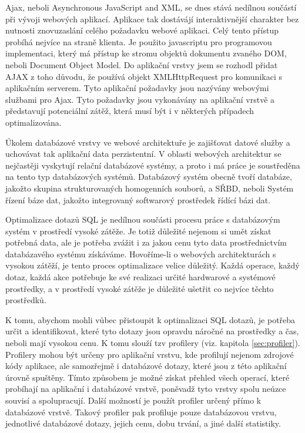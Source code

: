 \documentclass[12pt]{article}
\begin{document}
Ajax, neboli Asynchronous JavaScript and XML, se dnes stává nedílnou součástí při vývoji webových aplikací. Aplikace tak dostávájí interaktivnější charakter bez nutnosti znovuzaslání celého požadavku webové aplikaci. Celý tento přístup probíhá nejvíce na straně klienta. Je použito javascriptu pro programovou implementaci, který má přístup ke stromu objektů dokumentu zvaného DOM, neboli Document Object Model. Do aplikační vrstvy jsem se rozhodl přidat AJAX z toho důvodu, že používá objekt XMLHttpRequest pro komunikaci s aplikačním serverem. Tyto aplikační požadavky jsou nazývány webovými službami pro Ajax. Tyto požadavky jsou vykonávány na aplikační vrstvě a představují potenciální zátěž, která musí být i v některých případech optimalizována.\cite{ajax}



Úkolem databázové vrstvy ve webové architektuře je zajišťovat datové služby a uchovávat tak aplikační data perzistentní. V oblasti webových architektur se nejčastěji vyskytují relační databázové systémy, a proto i má práce je soustředěna na tento typ databázových systémů. Databázový systém obecně tvoří databáze, jakožto skupina strukturovaných homogenních souborů, a SŘBD, neboli Systém řízení báze dat, jakožto integrovaný softwarový prostředek řídící bázi dat.

Optimalizace dotazů SQL je nedílnou součásti procesu práce s databázovým systém v prostředí vysoké zátěže. Je totiž důležité nejenom si umět získat potřebná data, ale je potřeba zvážit i za jakou cenu tyto data prostřednictvím databázavého systému získáváme. Hovoříme-li o webových architekturách s vysokou zátěží, je tento proces optimalizace velice důležitý. Každá operace, každý dotaz, každá akce potřebuje ke své realizaci určité hardwarové a systémové prostředky, a v prostředí vysoké zátěže je důležité ušetřit co nejvíce těchto prostředků.

K tomu, abychom mohli vůbec přistoupit k optimalizaci SQL dotazů, je potřeba určit a identifikovat, které tyto dotazy jsou opravdu náročné na prostředky a čas, neboli mají vysokou cenu. K tomu slouží tzv profilery (viz. kapitola \ref{sec:profiler}). Profilery mohou být určeny pro aplikační vrstvu, kde profilují nejenom zdrojové kódy aplikace, ale samozřejmě i databázové dotazy, které jsou z této aplikační úrovně spuštěny. Tímto způsobem je možné získat přehled všech operací, které probíhají na aplikační i databázové vrstvě, poněvadž tyto vrstvy spolu neúzce souvisí a spolupracují. Další možností je použít profiler určený přímo k databázové vrstvě. Takový profiler pak profiluje pouze databázovou vrstvu, jednotlivé databázové dotazy, jejich cenu, dobu trvání, a jiné další statistiky.
\end{document}
